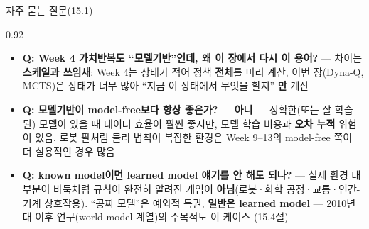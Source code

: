 \begin{frame}{자주 묻는 질문(15.1)}
\begin{center}\begin{varwidth}{0.92\textwidth}
  \small
  \begin{itemize}
    \item \textbf{Q: Week 4 가치반복도 ``모델기반''인데, 왜 이 장에서
      다시 이 용어?} --- 차이는 \textbf{스케일과 쓰임새}: Week 4는
      상태가 적어 정책 \textbf{전체}를 미리 계산, 이번 장(Dyna-Q,
      MCTS)은 상태가 너무 많아 ``지금 이 상태에서 무엇을 할지''
      \textbf{만} 계산
    \item \textbf{Q: 모델기반이 model-free보다 항상 좋은가?} ---
      \textbf{아니} --- 정확한(또는 잘 학습된) 모델이 있을 때 데이터
      효율이 훨씬 좋지만, 모델 학습 비용과 \textbf{오차 누적} 위험이
      있음. 로봇 팔처럼 물리 법칙이 복잡한 환경은 Week 9--13의
      model-free 쪽이 더 실용적인 경우 많음
    \item \textbf{Q: known model이면 learned model 얘기를 안 해도
      되나?} --- 실제 환경 대부분이 바둑처럼 규칙이 완전히 알려진
      게임이 \textbf{아님}(로봇·화학 공정·교통·인간-기계 상호작용).
      ``공짜 모델''은 예외적 특권, \textbf{일반은 learned model} ---
      2010년대 이후 연구(world model 계열)의 주목적도 이 케이스
      (15.4절)
  \end{itemize}
\end{varwidth}\end{center}
\end{frame}
